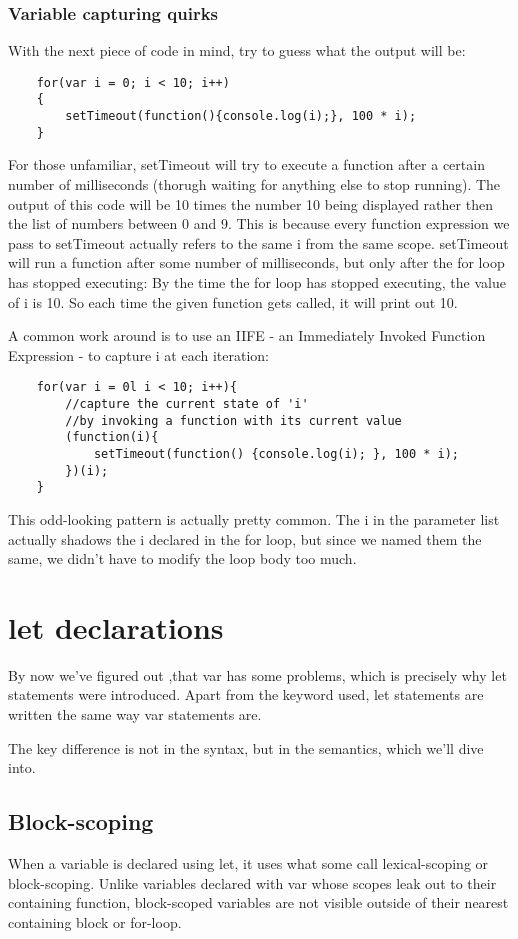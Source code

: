 \subsubsection{Variable capturing quirks}
With the next piece of code in mind, try to guess what the output will be:
\begin{lstlisting}
    for(var i = 0; i < 10; i++)
    {
        setTimeout(function(){console.log(i);}, 100 * i);
    }
\end{lstlisting}

For those unfamiliar, setTimeout will try to execute a function after a certain number of milliseconds (thorugh waiting for anything else to stop running). The output of this code will be 10 times the number 10 being displayed rather then the list of numbers between 0 and 9. This is because every function expression we pass to setTimeout actually refers to the same i from the same scope. setTimeout will run a function after some number of milliseconds, but only after the for loop has stopped executing: By the time the for loop has stopped executing, the value of i is 10. So each time the given function gets called, it will print out 10.

A common work around is to use an IIFE - an Immediately Invoked Function Expression - to capture i at each iteration:
\begin{lstlisting}
    for(var i = 0l i < 10; i++){
        //capture the current state of 'i'
        //by invoking a function with its current value
        (function(i){
            setTimeout(function() {console.log(i); }, 100 * i);
        })(i);
    }
\end{lstlisting}

This odd-looking pattern is actually pretty common. The i in the parameter list actually shadows the i declared in the for loop, but since we named them the same, we didn't have to modify the loop body too much.

\section{let declarations}
By now we've figured out ,that var has some problems, which is precisely why let statements were introduced. Apart from the keyword used, let statements are written the same way var statements are.

The key difference is not in the syntax, but in the semantics, which we'll dive into.

\subsection{Block-scoping}
When a variable is declared using let, it uses what some call lexical-scoping or block-scoping. Unlike variables declared with var whose scopes leak out to their containing function, block-scoped variables are not visible outside of their nearest containing block or for-loop.

